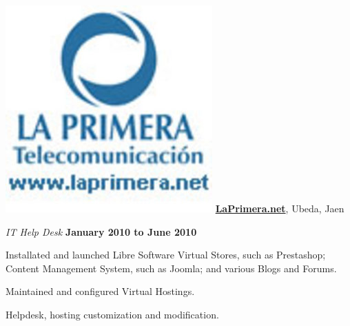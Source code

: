 \includegraphics[scale=0.1]{companies/laprimera} \href{https://www.laprimera.net/}{\textbf{LaPrimera.net}},
Ubeda, Jaen
\begin{outerlist}

\item[] \textit{IT Help Desk}%
        \hfill \textbf{January 2010 to June 2010}
\begin{innerlist}
\item Installated and launched Libre Software Virtual Stores, such as Prestashop; Content Management System, such as Joomla; and various Blogs and Forums.
\item Maintained and configured Virtual Hostings.
\item Helpdesk, hosting customization and modification.
\end{innerlist}

\end{outerlist}

%
%
%
